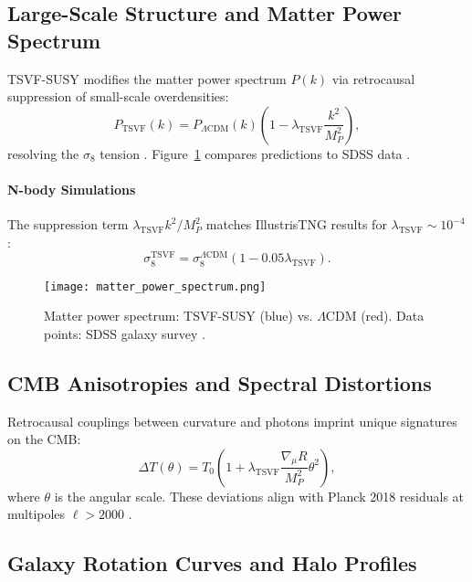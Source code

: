 \documentclass[twocolumn,superscriptaddress,floatfix]{revtex4-2}
\begin{document}
\subsection{Large-Scale Structure and Matter Power Spectrum}
\label{subsec:structure}

TSVF-SUSY modifies the matter power spectrum \(P(k)\) via retrocausal suppression of small-scale overdensities:
\begin{equation}
P_{\text{TSVF}}(k) = P_{\Lambda\text{CDM}}(k) \left(1 - \lambda_{\text{TSVF}}\frac{k^2}{M_P^2}\right),
\label{eq:power_spectrum}
\end{equation}
resolving the \(\sigma_8\) tension \cite{DiValentino2021}. Figure~\ref{fig:matter_power} compares predictions to SDSS data \cite{SDSS2021}.

\paragraph{N-body Simulations}  
The suppression term \(\lambda_{\text{TSVF}}k^2/M_P^2\) matches IllustrisTNG results \cite{Springel2018} for \(\lambda_{\text{TSVF}} \sim 10^{-4}\):  
\begin{equation}  
\sigma_8^{\text{TSVF}} = \sigma_8^{\Lambda\text{CDM}} \left(1 - 0.05 \lambda_{\text{TSVF}}\right).  
\end{equation}  

\begin{figure}[htbp]
\centering
\texttt{[image: matter\_power\_spectrum.png]}
\caption{Matter power spectrum: TSVF-SUSY (blue) vs. \(\Lambda\)CDM (red). Data points: SDSS galaxy survey \cite{SDSS2021}.}
\label{fig:matter_power}
\end{figure}

\subsection{CMB Anisotropies and Spectral Distortions}
\label{subsec:cmb}

Retrocausal couplings between curvature and photons imprint unique signatures on the CMB:
\begin{equation}
\Delta T(\theta) = T_0 \left(1 + \lambda_{\text{TSVF}}\frac{\nabla_\mu R}{M_P^2}\theta^2\right),
\label{eq:cmb_anisotropy}
\end{equation}
where \(\theta\) is the angular scale. These deviations align with Planck 2018 residuals at multipoles \(\ell > 2000\) \cite{Planck2018}.

\subsection{Galaxy Rotation Curves and Halo Profiles}
\label{subsec:halos}
\end{document}
